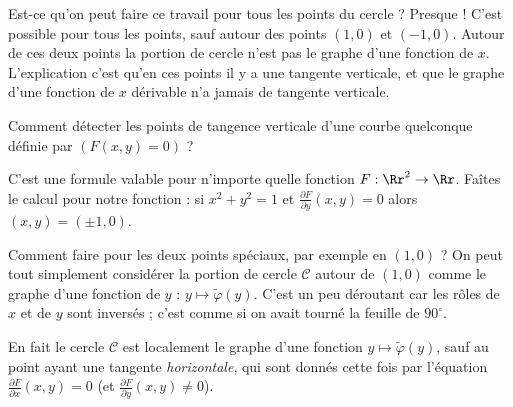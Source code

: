 \documentclass[11pt, class=report,crop=false]{standalone}
\begin{document}


\bigskip

Est-ce qu'on peut faire ce travail pour tous les points du cercle ? 
Presque ! C'est possible pour tous les points, sauf autour des points $(1,0)$ et $(-1,0)$. Autour de ces deux points la portion de cercle n'est pas le graphe d'une fonction de $x$. L'explication c'est qu'en ces points il y a une tangente verticale, et que le graphe d'une fonction de $x$ dérivable n'a jamais de tangente verticale.



\bigskip

Comment détecter les points de tangence verticale d'une courbe quelconque définie par $(F(x,y)=0)$ ?



C'est une formule valable pour n'importe quelle fonction $F :\Rr^2 \to \Rr$.
Faîtes le calcul pour notre fonction : si $x^2+y^2=1$ et $\frac{\partial F}{\partial y}(x,y)=0$ alors $(x,y)=(\pm1,0)$.

\bigskip

Comment faire pour les deux points spéciaux, par exemple en $(1,0)$ ? On peut tout simplement considérer la portion de cercle $\mathcal{C}$ autour de $(1,0)$ comme le graphe d'une fonction de $y$ : $y \mapsto \tilde\varphi(y)$. C'est un peu déroutant car les rôles de $x$ et de $y$ sont inversés ; c'est comme si on avait tourné la feuille de $90^\circ$.

\begin{center} 
    \begin{minipage}{0.3\textwidth}      
    \end{minipage}\qquad\qquad
    \begin{minipage}{0.55\textwidth}  
    \end{minipage}  
\end{center}


En fait le cercle $\mathcal{C}$ est localement le graphe d'une fonction $y \mapsto \tilde\varphi(y)$, sauf au point ayant une tangente \emph{horizontale}, qui sont donnés cette fois par l'équation $\frac{\partial F}{\partial x}(x,y)=0$ (et $\frac{\partial F}{\partial y}(x,y)\neq0$).
\end{document}
